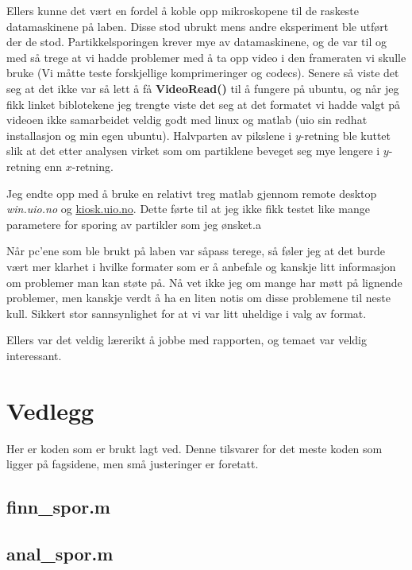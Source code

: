 \documentclass[a4paper,11pt, twocolumn]{article}
\begin{document}
Ellers kunne det vært en fordel å koble opp mikroskopene til de raskeste datamaskinene på laben. Disse stod ubrukt mens andre eksperiment ble utført der de stod. Partikkelsporingen krever mye av datamaskinene, og de var til og med så trege at vi hadde problemer med å ta opp video i den frameraten vi skulle bruke (Vi måtte teste forskjellige komprimeringer og codecs). Senere så viste det seg at det ikke var så lett å få {\bf VideoRead()} til å fungere på ubuntu, og når jeg fikk linket biblotekene jeg trengte viste det seg at det formatet vi hadde valgt på videoen ikke samarbeidet veldig godt med linux og matlab (uio sin redhat installasjon og min egen ubuntu). Halvparten av pikslene i $y$-retning ble kuttet slik at det etter analysen virket som om partiklene beveget seg mye lengere i $y$-retning enn $x$-retning.

Jeg endte opp med å bruke en relativt treg matlab gjennom remote desktop \textit{win.uio.no} og \url{kiosk.uio.no}. Dette førte til at jeg ikke fikk testet like mange parametere for sporing av partikler som jeg ønsket.a

Når pc'ene som ble brukt på laben var såpass terege, så føler jeg at det burde vært mer klarhet i hvilke formater som er å anbefale og kanskje litt informasjon om problemer man kan støte på. Nå vet ikke jeg om mange har møtt på lignende problemer, men kanskje verdt å ha en liten notis om disse problemene til neste kull. Sikkert stor sannsynlighet for at vi var litt uheldige i valg av format.

Ellers var det veldig lærerikt å jobbe med rapporten, og temaet var veldig interessant.


\printbibliography{}
\clearpage
\onecolumn
\appendix

\section{Vedlegg}
Her er koden som er brukt lagt ved. Denne tilsvarer for det meste koden som ligger på fagsidene, men små justeringer er foretatt.
\subsection{finn\_spor.m}
\label{app:finn}

\subsection{anal\_spor.m}
\label{app:anal}

\end{document}
